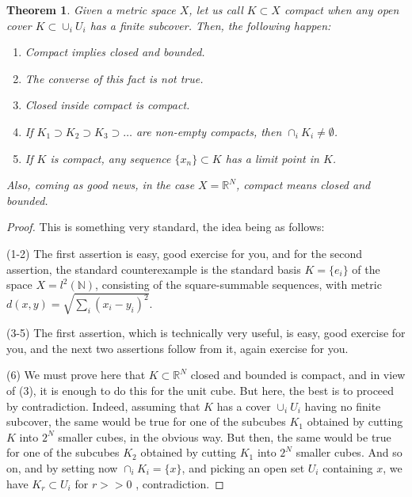 \documentclass[12pt]{amsbook}
\newtheorem{theorem}{Theorem}[chapter]
\begin{document}
\begin{theorem}
Given a metric space $X$, let us call $K\subset X$ compact when any open cover $K\subset\cup_iU_i$ has a finite subcover. Then, the following happen:
\begin{enumerate}
\item Compact implies closed and bounded.

\item The converse of this fact is not true.

\item Closed inside compact is compact.

\item If $K_1\supset K_2\supset K_3\supset\ldots$ are non-empty compacts, then $\cap_iK_i\neq\emptyset$.

\item If $K$ is compact, any sequence $\{x_n\}\subset K$ has a limit point in $K$.
\end{enumerate}
Also, coming as good news, in the case $X=\mathbb R^N$, compact means closed and bounded.
\end{theorem}

\begin{proof}
This is something very standard, the idea being as follows:

\medskip

(1-2) The first assertion is easy, good exercise for you, and for the second assertion, the standard counterexample is the standard basis $K=\{e_i\}$ of the space $X=l^2(\mathbb N)$, consisting of the square-summable sequences, with metric $d(x,y)=\sqrt{\sum_i(x_i-y_i)^2}$.

\medskip

(3-5) The first assertion, which is technically very useful, is easy, good exercise for you, and the next two assertions follow from it, again exercise for you.

\medskip

(6) We must prove here that $K\subset\mathbb R^N$ closed and bounded is compact, and in view of (3), it is enough to do this for the unit cube. But here, the best is to proceed by contradiction. Indeed, assuming that $K$ has a cover $\cup_iU_i$ having no finite subcover, the same would be true for one of the subcubes $K_1$ obtained by cutting $K$ into $2^N$ smaller cubes, in the obvious way. But then, the same would be true for one of the subcubes $K_2$ obtained by cutting $K_1$ into $2^N$ smaller cubes. And so on, and by setting now $\cap_iK_i=\{x\}$, and picking an open set $U_i$ containing $x$, we have $K_r\subset U_i$ for $r>>0$ , contradiction.
\end{proof}
\end{document}
